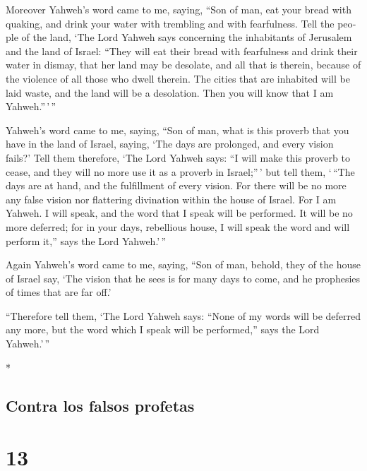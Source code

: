 \begin{paracol}{2}
\begin{otherlanguage}{english}
 Moreover Yahweh's word came to me, saying,
 ``Son of man, eat your bread with quaking, and drink
your water with trembling and with fearfulness.  Tell the
people of the land, `The Lord Yahweh says concerning the inhabitants of
Jerusalem and the land of Israel: ``They will eat their bread with
fearfulness and drink their water in dismay, that her land may be
desolate, and all that is therein, because of the violence of all those
who dwell therein.  The cities that are inhabited will be
laid waste, and the land will be a desolation. Then you will know that I
am Yahweh.''\,'\,''

 Yahweh's word came to me, saying,  ``Son
of man, what is this proverb that you have in the land of Israel,
saying, `The days are prolonged, and every vision fails?'
 Tell them therefore, `The Lord Yahweh says: ``I will
make this proverb to cease, and they will no more use it as a proverb in
Israel;''\,' but tell them, `\,``The days are at hand, and the
fulfillment of every vision.  For there will be no more
any false vision nor flattering divination within the house of Israel.
 For I am Yahweh. I will speak, and the word that I speak
will be performed. It will be no more deferred; for in your days,
rebellious house, I will speak the word and will perform it,'' says the
Lord Yahweh.'\,''

 Again Yahweh's word came to me, saying, 
``Son of man, behold, they of the house of Israel say, `The vision that
he sees is for many days to come, and he prophesies of times that are
far off.'

 ``Therefore tell them, `The Lord Yahweh says: ``None of
my words will be deferred any more, but the word which I speak will be
performed,'' says the Lord Yahweh.'\,''

\end{otherlanguage}

\switchcolumn[0]*

\hypertarget{contra-los-falsos-profetas}{%
\subsection{Contra los falsos
profetas}\label{contra-los-falsos-profetas}}

\hypertarget{section-24}{%
\section{13}\label{section-24}}


\end{paracol}
